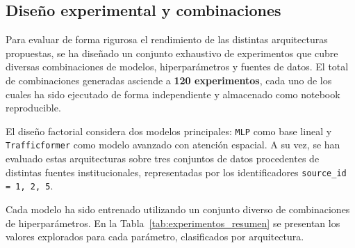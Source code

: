 \subsection{Diseño experimental y combinaciones}
\label{sec:diseño_exp_combinaciones}

Para evaluar de forma rigurosa el rendimiento de las distintas arquitecturas propuestas, se ha diseñado un conjunto exhaustivo de experimentos que cubre diversas combinaciones de modelos, hiperparámetros y fuentes de datos. El total de combinaciones generadas asciende a \textbf{120 experimentos}, cada uno de los cuales ha sido ejecutado de forma independiente y almacenado como notebook reproducible.

El diseño factorial considera dos modelos principales: \texttt{MLP} como base lineal y \texttt{Trafficformer} como modelo avanzado con atención espacial. A su vez, se han evaluado estas arquitecturas sobre tres conjuntos de datos procedentes de distintas fuentes institucionales, representadas por los identificadores \texttt{source\_id = 1, 2, 5}.

Cada modelo ha sido entrenado utilizando un conjunto diverso de combinaciones de hiperparámetros. En la Tabla~\ref{tab:experimentos_resumen} se presentan los valores explorados para cada parámetro, clasificados por arquitectura.

